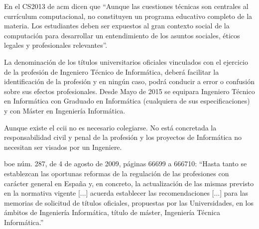 En el CS2013 de \gls{acm} dicen que ``Aunque las cuestiones técnicas son centrales al currículum computacional, no constituyen un programa educativo completo de la materia. Los estudiantes deben ser expuestos al gran contexto social de la computación para desarrollar un entendimiento de los asuntos sociales, éticos legales y profesionales relevantes''.

La denominación de los títulos universitarios oficiales vinculados con el ejercicio de la profesión de Ingeniero Técnico de Informática, deberá facilitar la identificación de la profesión y en ningún caso, podrá conducir a error o confusión sobre sus efectos profesionales.
Desde Mayo de 2015 se equipara Ingeniero Técnico en Informática con Graduado en Informática (cualquiera de sus especificaciones) y con Máster en Ingeniería Informática.

Aunque existe el \gls{ccii} no es necesario colegiarse. No está concretada la responsabilidad civil y penal de la profesión y los proyectos de Informática no necesitan ser visados por un Ingeniere.

\gls{boe} núm. 287, de 4 de agosto de 2009, páginas 66699 a 666710:
``Hasta tanto se establezcan las oportunas reformas de la regulación de las profesiones con carácter general en España y, en concreto, la actualización de las mismas previsto en la normativa vigente [...] acuerda establecer las recomendaciones [...] para las memorias de solicitud de títulos oficiales, propuestas por las Universidades, en los ámbitos de Ingeniería  Informática, título de máster, Ingeniería Técnica Informática.''

